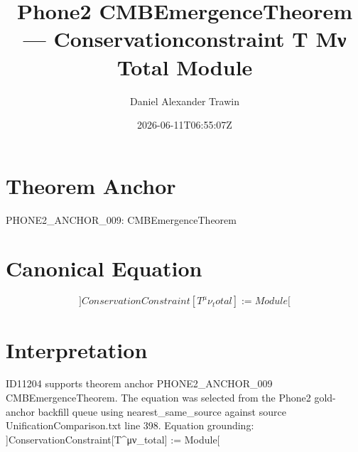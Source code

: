 \documentclass[11pt]{article}
\title{Phone2 CMBEmergenceTheorem — Conservationconstraint T Μν Total Module}
\author{Daniel Alexander Trawin}
\date{2026-06-11T06:55:07Z}
\begin{document}
\maketitle
\section*{Theorem Anchor}
PHONE2_ANCHOR_009: CMBEmergenceTheorem
\section*{Canonical Equation}
\[
]ConservationConstraint[T^μν_total] := Module[
\]
\section*{Interpretation}
ID11204 supports theorem anchor PHONE2_ANCHOR_009 CMBEmergenceTheorem. The equation was selected from the Phone2 gold-anchor backfill queue using nearest_same_source against source UnificationComparison.txt line 398. Equation grounding: ]ConservationConstraint[T^μν_total] := Module[
\end{document}
